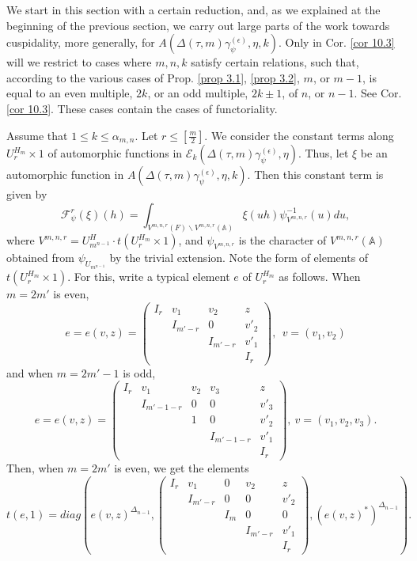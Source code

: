 \documentclass[12pts]{amsart}
\newcommand{\BA}{{\mathbb {A}}}
\begin{document}
We start in this section with a certain reduction, and, as we explained at the beginning of the previous section, we carry out large parts of the work towards cuspidality, more generally, for $A(\Delta(\tau,m)\gamma_\psi^{(\epsilon)}, \eta,k)$. Only in Cor. \ref{cor 10.3} will we restrict to cases where $m,n,k$ satisfy certain relations, such that, according to the various cases of Prop. \ref{prop 3.1}, \ref{prop 3.2}, $m$, or $m-1$, is equal to an even multiple, $2k$, or an odd multiple, $2k\pm 1$, of $n$, or $n-1$. See Cor. \ref{cor 10.3}. These cases contain the cases of functoriality.

Assume that  $1\leq k\leq\alpha_{m,n}$. Let $r\leq [\frac{m}{2}]$. We consider the constant terms along $U^{H_m}_r\times 1$ of automorphic functions in $\mathcal{E}_k(\Delta(\tau,m)\gamma_\psi^{(\epsilon)},\eta)$. Thus, let $\xi$ be an automorphic function in $A(\Delta(\tau,m)\gamma_\psi^{(\epsilon)},\eta,k)$. Then this constant term is given by
\begin{equation}\label{4.1}
\mathcal{F}_\psi^r(\xi)(h)=\int_{V^{m,n,r}(F)\backslash V^{m,n,r}(\BA)}\xi(uh)\psi^{-1}_{V^{m,n,r}}(u)du,
\end{equation}
where $V^{m,n,r}=U^H_{m^{n-1}}\cdot t(U^{H_m}_r\times 1)$, and $\psi_{V^{m,n,r}}$ is the character of $V^{m,n,r}(\BA)$ obtained from $\psi_{U_{m^{n-1}}}$ by the trivial extension. Note the form of elements of $t(U^{H_m}_r\times 1)$. For this, write a typical element $e$ of $U^{H_m}_r$ as follows. When $m=2m'$ is even,
$$
e=e(v,z)=\begin{pmatrix}I_r&v_1&v_2&z\\&I_{m'-r}&0&v'_2\\&&I_{m'-r}&v'_1\\&&&I_r\end{pmatrix},\ \  v=(v_1,v_2)
$$
and when $m=2m'-1$ is odd,
$$
e=e(v,z)=\begin{pmatrix}I_r&v_1&v_2&v_3&z\\&I_{m'-1-r}&0&0&v'_3\\&&1&0&v'_2\\&&&I_{m'-1-r}&v'_1\\&&&&I_r\end{pmatrix},\ v=(v_1,v_2,v_3).
$$
Then, when $m=2m'$ is even, we get the elements
\begin{equation}\label{4.2}
t(e,1)=diag(e(v,z)^{\Delta_{n-1}},\begin{pmatrix}I_r&v_1&0&v_2&z\\&I_{m'-r}&0&0&v'_2\\&&I_m&0&0\\&&&I_{m'-r}&v'_1\\&&&&I_r\end{pmatrix}, (e(v,z)^*)^{\Delta_{n-1}}).
\end{equation}
\end{document}
